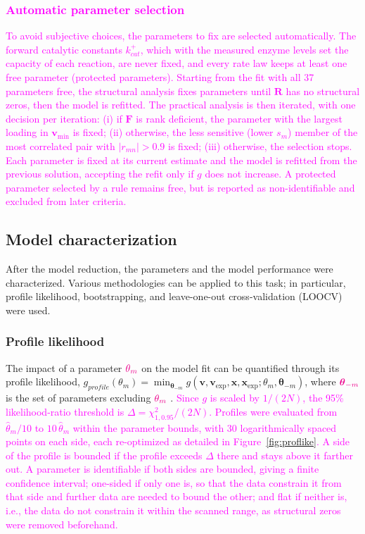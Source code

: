 \documentclass[conference]{IEEEtran}
\begin{document}
\subsubsection{\textcolor{magenta}{Automatic parameter selection}}
\textcolor{magenta}{To avoid subjective choices, the parameters to fix are selected automatically. The forward catalytic constants $k^+_{cat}$, which with the measured enzyme levels set the capacity of each reaction, are never fixed, and every rate law keeps at least one free parameter (protected parameters).
Starting from the fit with all 37 parameters free, the structural analysis fixes parameters until $\mathbf{R}$ has no structural zeros, then the model is refitted.
The practical analysis is then iterated, with one decision per iteration:
(i) if $\mathbf{F}$ is rank deficient, the parameter with the largest loading in $\mathbf{v}_{\min}$ is fixed;
(ii) otherwise, the less sensitive (lower $s_m$) member of the most correlated pair with $|r_{mn}|>0.9$ is fixed;
(iii) otherwise, the selection stops.
Each parameter is fixed at its current estimate and the model is refitted from the previous solution, accepting the refit only if $g$ does not increase. A protected parameter selected by a rule remains free, but is reported as non-identifiable and excluded from later criteria.}

\subsection{Model characterization}

After the model reduction, the parameters and the model performance were characterized. Various methodologies can be applied to this task; in particular, profile likelihood, bootstrapping, and leave-one-out cross-validation (LOOCV) were used.

\subsubsection{Profile likelihood}
The impact of a parameter $\textcolor{magenta}{\theta_m}$ on the model fit can be quantified through its profile likelihood, $g_{profile}(\theta_m) = \min_{\boldsymbol{\theta}_{-m}} g(\mathbf{v}, \mathbf{v}_{\text{exp}}, \mathbf{x}, \mathbf{x}_{\text{exp}}; \theta_m, \boldsymbol{\theta}_{-m})$, where $\textcolor{magenta}{\boldsymbol{\theta}_{-m}}$ is the set of parameters excluding $\textcolor{magenta}{\theta_m}$ \cite{Wieland2021StructuralPracticalIdentifiability}.\textcolor{magenta}{ Since $g$ is scaled by $1/(2N)$, the 95\% likelihood-ratio threshold is $\Delta=\chi^2_{1,0.95}/(2N)$. Profiles were evaluated from $\hat{\theta}_m/10$ to $10\,\hat{\theta}_m$ within the parameter bounds, with 30 logarithmically spaced points on each side, each re-optimized as detailed in Figure~\ref{fig:proflike}. A side of the profile is bounded if the profile exceeds $\Delta$ there and stays above it farther out. A parameter is identifiable if both sides are bounded, giving a finite confidence interval; one-sided if only one is, so that the data constrain it from that side and further data are needed to bound the other; and flat if neither is, i.e., the data do not constrain it within the scanned range, as structural zeros were removed beforehand.}
\end{document}
